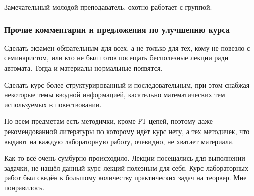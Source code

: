             \begin{commentbox} 
                Замечательный молодой преподаватель, охотно работает с группой. 
            \end{commentbox} 

    
    \subsubsection{Прочие комментарии и предложения по улучшению курса}
        \begin{commentbox}
            Сделать экзамен обязательным для всех, а не только для тех, кому не повезло с семинаристом, или кто не был готов посещать бесполезные лекции ради автомата. Тогда и материалы нормальные появятся.
        \end{commentbox}

        \begin{commentbox}
            Сделать курс более структурированный и последовательным, при этом снабжая некоторые темы вводной информацией, касательно математических тем используемых в повествовании.
        \end{commentbox}

        \begin{commentbox}
            По всем предметам есть методички, кроме РТ цепей, поэтому даже рекомендованной литературы по которому идёт курс нету, а тех методичек, что выдают на каждую лабораторную работу, очевидно, не хватает материала.
        \end{commentbox}

        \begin{commentbox}
            Как то всё очень сумбурно происходило. Лекции посещались для выполнении задачки, не нашёл данный курс лекций полезным для себя. Курс лабораторных работ был сведён к большому количеству практических задач на теорвер. Мне понравилось.
        \end{commentbox}
